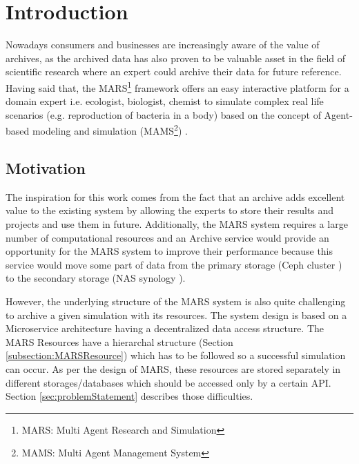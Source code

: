 \frenchspacing
\newpage
    \chapter{Introduction}
    Nowadays consumers and businesses are increasingly aware  of the value of archives, as the archived data has also proven
    to be valuable asset in the field of scientific research where an expert could archive their data for future reference. Having said that, the 
    MARS\footnote{MARS: Multi Agent Research and Simulation} framework offers an easy interactive platform for a domain expert i.e. ecologist, biologist, 
    chemist to simulate complex real life scenarios (e.g. reproduction of bacteria in a body) based on the concept of Agent-based modeling and simulation 
    (MAMS\footnote{MAMS: Multi Agent Management System}) \cite{agentModeling}.

        \section{Motivation}
        The inspiration for this work comes from the fact that an archive adds excellent value to the existing system by allowing the experts to store 
        their results and projects and use them in future. Additionally, the MARS system requires a large number of computational resources and
        an Archive service would provide an opportunity for the MARS system to improve their
        performance because this service would move some part of data from the primary storage (Ceph cluster \cite{Ceph}) to the secondary storage (NAS synology \cite{Synology}). 

        However, the underlying structure of the MARS system is also quite challenging to archive 
        a given simulation with its resources. The system design is based on a Microservice architecture \cite{MicroserviceNewMan} having a decentralized data \cite{atomic} access structure. 
        The MARS Resources have a hierarchal
        structure (Section \ref{subsection:MARSResource}) which has to be followed so a successful simulation can occur. As per the design of MARS, these resources
        are stored separately in different storages/databases which should be accessed only by a certain API. Section
        \ref{sec:problemStatement} describes those difficulties.  


